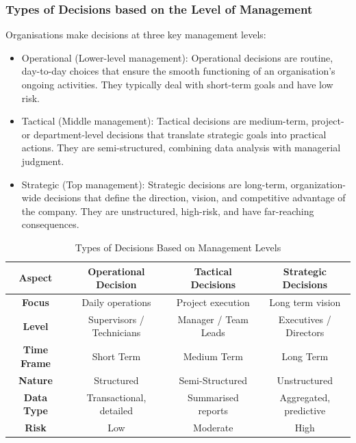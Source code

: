 \subsubsection{Types of Decisions based on the Level of Management}

\indent 

Organisations make decisions at three key management levels:

\begin{itemize}
    \item Operational (Lower-level management): Operational decisions are routine, day-to-day choices that ensure the smooth functioning of an organisation’s ongoing activities. They typically deal with short-term goals and have low risk.
    \item Tactical (Middle management): Tactical decisions are medium-term, project- or department-level decisions that translate strategic goals into practical actions. They are semi-structured, combining data analysis with managerial judgment.
    \item Strategic (Top management): Strategic decisions are long-term, organization-wide decisions that define the direction, vision, and competitive advantage of the company. They are unstructured, high-risk, and have far-reaching consequences.
\end{itemize}

\begin{table}[htbp]
\centering
\renewcommand{\arraystretch}{1.35}
\begin{tabular}{|c|c|c|c|}
\hline
\textbf{Aspect} & \textbf{Operational Decision} & \textbf{Tactical Decisions} & \textbf{Strategic Decisions} \\
\hline

\textbf{Focus} &
Daily operations &
Project execution &
Long term vision \\
\hline

\textbf{Level} &
Supervisors / Technicians &
Manager / Team Leads &
Executives / Directors \\
\hline

\textbf{Time Frame} &
Short Term &
Medium Term &
Long Term \\
\hline

\textbf{Nature} &
Structured &
Semi-Structured &
Unstructured \\
\hline

\textbf{Data Type} &
Transactional, detailed &
Summarised reports &
Aggregated, predictive \\
\hline

\textbf{Risk} &
Low &
Moderate &
High \\
\hline

\end{tabular}
\caption{Types of Decisions Based on Management Levels}
\end{table}

